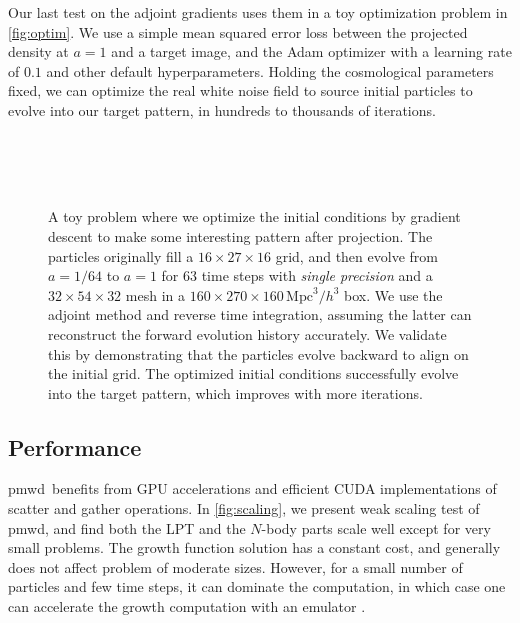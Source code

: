 \documentclass[modern, trackchanges, dvipsnames]{aastex631}
\newcommand{\pmwd}{{\usefont{T1}{nova}{m}{sl}pmwd}}
\newcommand{\Mpc}{\mathrm{Mpc}}
\begin{document}
Our last test on the adjoint gradients uses them in a toy optimization
problem in \autoref{fig:optim}.
We use a simple mean squared error loss between the projected density at
$a=1$ and a target image, and the Adam optimizer \citep{Adam} with a
learning rate of $0.1$ and other default hyperparameters.
Holding the cosmological parameters fixed, we can optimize the real
white noise field to source initial particles to evolve into our target
pattern, in hundreds to thousands of iterations.


\begin{figure*}[t]
\centering
{}
\hfill
{}
\\
\hfill
{}
\\
\hfill
{}
\\
\caption{A toy problem where we optimize the initial conditions by
gradient descent to make some interesting pattern after projection.
The particles originally fill a $16\times27\times16$ grid, and then
evolve from $a=1/64$ to $a=1$ for 63 time steps with \emph{single
precision} and a $32\times54\times32$ mesh in a $160\times270\times160
\, \Mpc^3/h^3$ box.
We use the adjoint method and reverse time integration, assuming the
latter can reconstruct the forward evolution history accurately.
We validate this by demonstrating that the particles evolve backward to
align on the initial grid.
The optimized initial conditions successfully evolve into the target
pattern, which improves with more iterations.
}
\label{fig:optim}
\end{figure*}


\vspace{1em}
\subsection{Performance}

\pmwd\ benefits from GPU accelerations and efficient CUDA
implementations of scatter and gather operations.
In \autoref{fig:scaling}, we present weak scaling test of \pmwd, and
find both the LPT and the $N$-body parts scale well except for very
small problems.
The growth function solution has a constant cost, and generally does not
affect problem of moderate sizes.
However, for a small number of particles and few time steps, it can
dominate the computation, in which case one can accelerate the growth
computation with an emulator \citep{KwanModiEtAl2022}.
\end{document}
